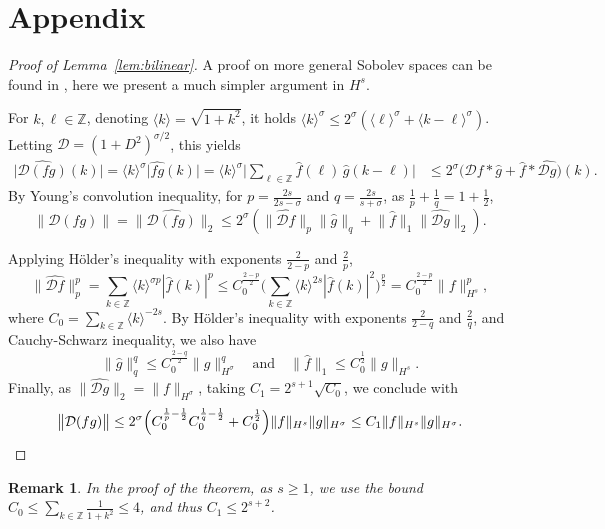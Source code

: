 \documentclass [11pt] {article}
\newtheorem{rem}[thm]{Remark}
\begin{document}
\section{Appendix}\label{sec:appendix}
\begin{proof}[Proof of Lemma~\ref{lem:bilinear}]
A proof on more general Sobolev spaces can be found in \cite[Theorem 4.39]{AF03}, here we present a much simpler argument in $H^s$.

For $k,\ell\in \mathbb Z$, denoting $\langle k\rangle=\sqrt{1+k^2}$, it holds $\langle k\rangle^\sigma\leq 2^{\sigma}(\langle\ell\rangle^\sigma+\langle k-\ell\rangle^\sigma)$. Letting $\mathcal D=(1+D^2)^{\sigma/2}$, this yields
\begin{align*}
\Big|\widehat{\mathcal D(fg)}(k)\Big|
=\langle k\rangle^\sigma\Big|\widehat{fg}(k)\Big|
=\langle k\rangle^\sigma\Big|\sum_{\ell\in\mathbb Z}\widehat f(\ell)\, \widehat g(k-\ell)\Big|
&\leq 2^{\sigma} \Big(\widehat{\mathcal Df}*\widehat g+\widehat f*\widehat{\mathcal Dg}\Big)(k).
\end{align*}
By Young's convolution inequality, for $p=\frac{2s}{2s-\sigma}$ and $q=\frac{2s}{s+\sigma}$, as $\frac{1}{p}+\frac{1}{q}=1+\frac{1}{2}$,
\[
\big\|\mathcal D(fg)\big\|=\big\|\widehat{\mathcal D(fg)}\big\|_2
\leq 2^{\sigma}\left(\big\|\widehat{\mathcal Df}\big\|_p\big\|\widehat g\big\|_q+\big\|\widehat f\big\|_1\big\|\widehat{\mathcal Dg}\big\|_2\right).
\]

Applying H\"older's inequality with exponents $\frac{2}{2-p}$ and $\frac{2}{p}$,
\[
\big\|\widehat{\mathcal Df}\big\|_p^p
=\sum_{k\in \mathbb Z}\langle k\rangle^{\sigma p} |\widehat f(k)|^p
\leq C_0^{\frac{2-p}{2}}\Big(\sum_{k\in \mathbb Z}\langle k\rangle^{2s}|\widehat f(k)|^2\Big)^{\frac{p}{2}}
=C_0^{\frac{2-p}{2}} \|f\|_{H^s}^p,
\]
where
$
C_0=\sum_{k\in \mathbb Z}\langle k\rangle^{-2s}.
$
By H\"older's inequality with exponents $\frac{2}{2-q}$ and $\frac{2}{q}$, and Cauchy-Schwarz inequality, we also have
\[
\big\|\widehat g\big\|_q^q\leq C_0^{\frac{2-q}{2}}\|g\|_{H^\sigma}^q
\quad \text{and}\quad
\|\widehat f\|_1\leq C_0^{\frac{1}{2}}\|g\|_{H^s}.
\]
Finally, as $\big\|\widehat{\mathcal Dg}\big\|_2= \|f\|_{H^\sigma}$, taking $C_1=2^{s+1}\sqrt{C_0}$, we conclude with
\[
\big\|\mathcal D(fg)\big\|
\leq 2^{\sigma}\Big(C_0^{\frac{1}{p}-\frac{1}{2}}C_0^{\frac{1}{q}-\frac{1}{2}}+C_0^\frac{1}{2}\Big)\|f\|_{H^s}\|g\|_{H^\sigma}
\leq C_1\|f\|_{H^s}\|g\|_{H^\sigma}.\qedhere
\]
\end{proof}

\begin{rem}
\label{remC1}
In the proof of the theorem, as $s\ge 1$, we use the bound
$C_0\leq \sum_{k\in \mathbb Z}\frac{1}{1+k^2}\leq 4$,
and thus $C_1\leq 2^{s+2}$.
\end{rem}
\end{document}

